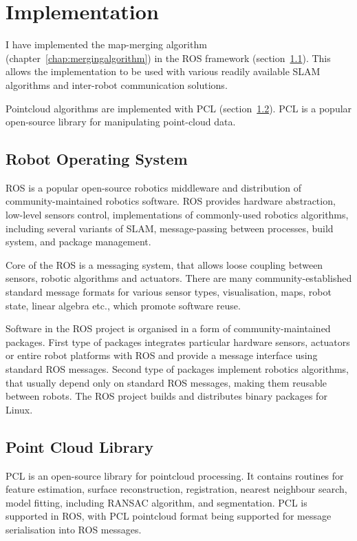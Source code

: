 \chapter{Implementation}
\label{chap:implementation}

I have implemented the map-merging algorithm (chapter~\ref{chap:mergingalgorithm}) in the \gls{ROS} framework (section~\ref{sec:ros}). This allows the implementation to be used with various readily available \gls{SLAM} algorithms and inter-robot communication solutions.

Pointcloud algorithms are implemented with \gls{PCL} (section~\ref{sec:pcl}). \gls{PCL} is a popular open-source library for manipulating point-cloud data.

\section{Robot Operating System}
\label{sec:ros}

\gls{ROS} is a popular open-source robotics middleware and distribution of community-maintained robotics software. \gls{ROS} provides hardware abstraction, low-level sensors control, implementations of commonly-used robotics algorithms, including several variants of \gls{SLAM}, message-passing between processes, build system, and package management.

Core of the \gls{ROS} is a messaging system, that allows loose coupling between sensors, robotic algorithms and actuators. There are many community-established standard message formats for various sensor types, visualisation, maps, robot state, linear algebra etc., which promote software reuse.

Software in the \gls{ROS} project is organised in a form of community-maintained packages. First type of packages integrates particular hardware sensors, actuators or entire robot platforms with \gls{ROS} and provide a message interface using standard \gls{ROS} messages. Second type of packages implement robotics algorithms, that usually depend only on standard \gls{ROS} messages, making them reusable between robots. The \gls{ROS} project builds and distributes binary packages for Linux.

\section{Point Cloud Library}
\label{sec:pcl}

\gls{PCL} is an open-source library for pointcloud processing. It contains routines for feature estimation, surface reconstruction, registration, nearest neighbour search, model fitting, including \gls{RANSAC} algorithm, and segmentation. \Gls{PCL} is supported in \gls{ROS}, with \gls{PCL} pointcloud format being supported for message serialisation into \gls{ROS} messages.

